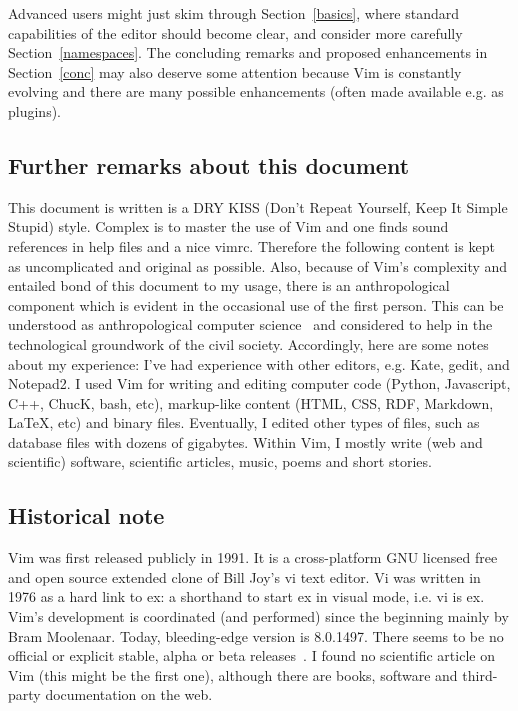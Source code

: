\documentclass{article}
\begin{document}
Advanced users might just skim through
Section~\ref{basics}, where standard capabilities of
the editor should become clear, and consider more carefully
Section~\ref{namespaces}.
The concluding remarks and proposed enhancements in Section~\ref{conc}
may also deserve some attention because
Vim is constantly evolving
and there are many possible enhancements
(often made available e.g. as plugins).

\subsection{Further remarks about this document}\label{furRem}
This document is written is a DRY KISS
(Don't Repeat Yourself, Keep It Simple Stupid) style.
Complex is to master the use of Vim
and one finds sound
references in help files and a nice vimrc.
Therefore the following content is kept
as uncomplicated and original as possible.
Also, because of Vim's complexity and entailed
bond of this document to my usage,
there is an anthropological component
which is evident in the occasional use of the first person.
This can be understood as anthropological computer science~\cite{anPh,anPh2}
and considered to help
in the technological groundwork of the civil society.
Accordingly, here are some notes about my experience:
I've had experience with other editors, e.g. Kate, gedit, and Notepad2.
I used Vim for writing and editing computer code 
(Python, Javascript, C++, ChucK, bash, etc), markup-like content
(HTML, CSS, RDF, Markdown, \LaTeX, etc) and binary files.
Eventually, I edited other types of files, such as database files with
dozens of gigabytes.
Within Vim, I mostly write (web and scientific) software,
scientific articles, music, poems and short stories.

\subsection{Historical note}
Vim was first released publicly in 1991.
It is a cross-platform GNU licensed free and open source
extended clone of Bill Joy's vi text editor.
Vi was written in 1976 as a hard link to ex: a shorthand
to start ex in visual mode, i.e. vi is ex.
Vim's development is coordinated (and performed) since the beginning
mainly by Bram Moolenaar.
Today, bleeding-edge version is 8.0.1497.
There seems to be no official or explicit stable, alpha or beta releases~\cite{noOfficial}.
I found no scientific article on Vim 
(this might be the first one), although there are
books, software and third-party documentation on the
web.~\cite{wikiVim}
\end{document}
